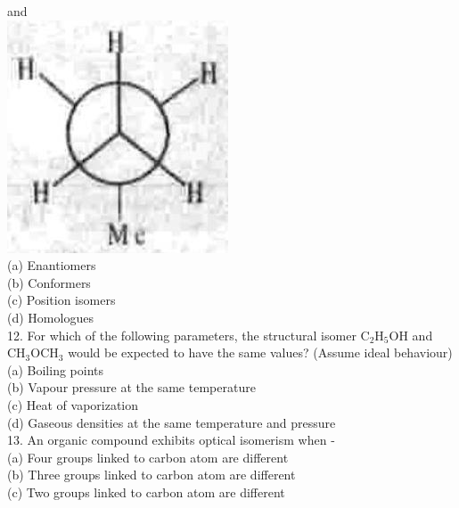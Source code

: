 \documentclass[10pt]{article}
\begin{document}
and\\
\includegraphics[max width=\textwidth, center]{2025_01_28_8470952b98110cec3aabg-064(2)}\\
(a) Enantiomers\\
(b) Conformers\\
(c) Position isomers\\
(d) Homologues\\
12. For which of the following parameters, the structural isomer $\mathrm{C}_{2} \mathrm{H}_{5} \mathrm{OH}$ and $\mathrm{CH}_{3} \mathrm{OCH}_{3}$ would be expected to have the same values? (Assume ideal behaviour)\\
(a) Boiling points\\
(b) Vapour pressure at the same temperature\\
(c) Heat of vaporization\\
(d) Gaseous densities at the same temperature and pressure\\
13. An organic compound exhibits optical isomerism when -\\
(a) Four groups linked to carbon atom are different\\
(b) Three groups linked to carbon atom are different\\
(c) Two groups linked to carbon atom are different\\
\end{document}
